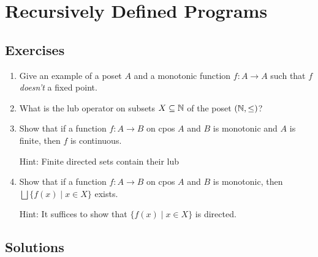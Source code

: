 \chapter{Recursively Defined Programs}

\section{Exercises}

\begin{enumerate}
    \item Give an example of a poset $A$ and a monotonic function $f \colon A \to A$ such that $f$ \textit{doesn't} a fixed point.

    \item What is the lub operator on subsets $X \subseteq \operatorname{\mathbb{N}}$ of the poset $(\operatorname{\mathbb{N}}, \leq)$?

    \item Show that if a function $f \colon A \to B$ on cpos $A$ and $B$ is monotonic and $A$ is finite, then $f$ is continuous.

    Hint: Finite directed sets contain their lub

    \item Show that if a function $f \colon A \to B$ on cpos $A$ and $B$ is monotonic, then $\bigsqcup\{f(x) \mid x \in X\}$ exists.

    Hint: It suffices to show that $\{f(x) \mid x \in X\}$ is directed.
\end{enumerate}

\section{Solutions}

